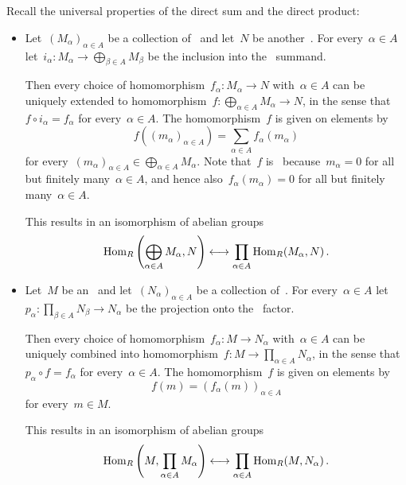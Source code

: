 \section{}

Recall the universal properties of the direct sum and the direct product:

\begin{itemize}
  \item
    Let~$(M_\alpha)_{\alpha \in A}$ be a collection of~{} and let~$N$ be another~{}.
    For every~$\alpha \in A$ let~$i_\alpha \colon M_\alpha \to \bigoplus_{\beta \in A} M_\beta$ be the inclusion into the~ summand.
    
    Then every choice of homomorphism~$f_\alpha \colon M_\alpha \to N$ with~$\alpha \in A$ can be uniquely extended to homomorphism~$f \colon \bigoplus_{\alpha \in A} M_\alpha \to N$, in the sense that~$f \circ i_\alpha = f_\alpha$ for every~$\alpha \in A$.
    The homomorphism~$f$ is given on elements by
    \[
        f\left( (m_\alpha)_{\alpha \in A} \right)
      = \sum_{\alpha \in A} f_\alpha(m_\alpha)
    \]
    for every~$(m_\alpha)_{\alpha \in A} \in \bigoplus_{\alpha \in A} M_\alpha$.
    Note that~$f$ is~{\welldef} because~$m_\alpha = 0$ for all but finitely many~$\alpha \in A$, and hence also~$f_\alpha(m_\alpha) = 0$ for all but finitely many~$\alpha \in A$.
    
    This results in an isomorphism of abelian groups
    \[
        \operatorname{Hom}_R\left( \bigoplus_{\alpha \in A} M_\alpha, N \right)
      \longleftrightarrow
        \prod_{\alpha \in A} \operatorname{Hom}_R(M_\alpha, N) \,.
    \]
  \item
    Let~$M$ be an~{} and let~$(N_\alpha)_{\alpha \in A}$ be a collection of~{}.
    For every~$\alpha \in A$ let~$p_\alpha \colon \prod_{\beta \in A} N_\beta \to N_\alpha$ be the projection onto the~ factor.
    
    Then every choice of homomorphism~$f_\alpha \colon M \to N_\alpha$ with~$\alpha \in A$ can be uniquely combined into homomorphism~$f \colon M \to \prod_{\alpha \in A} N_\alpha$, in the sense that~$p_\alpha \circ f = f_\alpha$ for every~$\alpha \in A$.
    The homomorphism~$f$ is given on elements by
    \[
        f(m)
      = ( f_\alpha(m) )_{\alpha \in A}
    \]
    for every~$m \in M$.
    
    This results in an isomorphism of abelian groups
    \[
        \operatorname{Hom}_R\left( M, \prod_{\alpha \in A} M_\alpha \right)
      \longleftrightarrow
        \prod_{\alpha \in A} \operatorname{Hom}_R(M, N_\alpha) \,.
    \]
\end{itemize}

